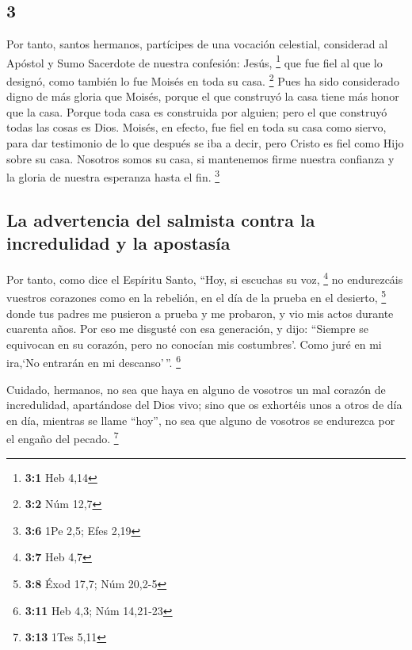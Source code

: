 \begin{paracol}{2}
\hypertarget{section-4}{%
\section{3}\label{section-4}}

 Por tanto, santos hermanos, partícipes de una vocación
celestial, considerad al Apóstol y Sumo Sacerdote de nuestra confesión:
Jesús, \footnote{\textbf{3:1} Heb 4,14}  que fue fiel al
que lo designó, como también lo fue Moisés en toda su casa. \footnote{\textbf{3:2}
  Núm 12,7}  Pues ha sido considerado digno de más gloria
que Moisés, porque el que construyó la casa tiene más honor que la casa.
 Porque toda casa es construida por alguien; pero el que
construyó todas las cosas es Dios.  Moisés, en efecto, fue
fiel en toda su casa como siervo, para dar testimonio de lo que después
se iba a decir,  pero Cristo es fiel como Hijo sobre su
casa. Nosotros somos su casa, si mantenemos firme nuestra confianza y la
gloria de nuestra esperanza hasta el fin. \footnote{\textbf{3:6} 1Pe
  2,5; Efes 2,19}

\hypertarget{la-advertencia-del-salmista-contra-la-incredulidad-y-la-apostasuxeda}{%
\subsection{La advertencia del salmista contra la incredulidad y la
apostasía}\label{la-advertencia-del-salmista-contra-la-incredulidad-y-la-apostasuxeda}}

 Por tanto, como dice el Espíritu Santo, ``Hoy, si
escuchas su voz, \footnote{\textbf{3:7} Heb 4,7}  no
endurezcáis vuestros corazones como en la rebelión, en el día de la
prueba en el desierto, \footnote{\textbf{3:8} Éxod 17,7; Núm 20,2-5}
 donde tus padres me pusieron a prueba y me probaron, y
vio mis actos durante cuarenta años.  Por eso me disgusté
con esa generación, y dijo: ``Siempre se equivocan en su corazón, pero
no conocían mis costumbres'.  Como juré en mi ira,`No
entrarán en mi descanso'\,''. \footnote{\textbf{3:11} Heb 4,3; Núm
  14,21-23}

 Cuidado, hermanos, no sea que haya en alguno de vosotros
un mal corazón de incredulidad, apartándose del Dios vivo;
 sino que os exhortéis unos a otros de día en día,
mientras se llame ``hoy'', no sea que alguno de vosotros se endurezca
por el engaño del pecado. \footnote{\textbf{3:13} 1Tes 5,11}


\end{paracol}
